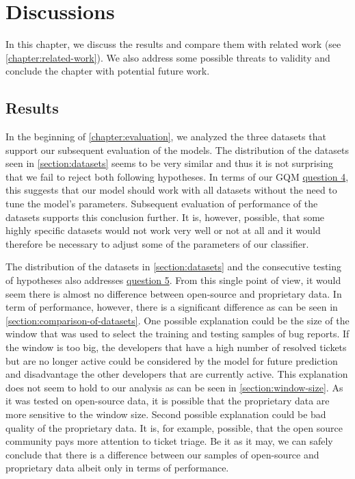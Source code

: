 \chapter{Discussions}

In this chapter, we discuss the results and compare them with related work (see \autoref{chapter:related-work}). We also address some possible threats to validity and conclude the chapter with potential future work.

\section{Results}

In the beginning of \autoref{chapter:evaluation}, we analyzed the three datasets that support our subsequent evaluation of the models. The distribution of the datasets seen in \autoref{section:datasets} seems to be very similar and thus it is not surprising that we fail to reject both following hypotheses. In terms of our GQM \hyperlink{question:4}{question 4}, this suggests that our model should work with all datasets without the need to tune the model's parameters. Subsequent evaluation of performance of the datasets supports this conclusion further. It is, however, possible, that some highly specific datasets would not work very well or not at all and it would therefore be necessary to adjust some of the parameters of our classifier.

The distribution of the datasets in \autoref{section:datasets} and the consecutive testing of hypotheses also addresses \hyperlink{question:5}{question 5}. From this single point of view, it would seem there is almost no difference between open-source and proprietary data. In term of performance, however, there is a significant difference as can be seen in \autoref{section:comparison-of-datasets}. One possible explanation could be the size of the window that was used to select the training and testing samples of bug reports. If the window is too big, the developers that have a high number of resolved tickets but are no longer active could be considered by the model for future prediction and disadvantage the other developers that are currently active. This explanation does not seem to hold to our analysis as can be seen in \autoref{section:window-size}. As it was tested on open-source data, it is possible that the proprietary data are more sensitive to the window size. Second possible explanation could be bad quality of the proprietary data. It is, for example, possible, that the open source community pays more attention to ticket triage. Be it as it may, we can safely conclude that there is a difference between our samples of open-source and proprietary data albeit only in terms of performance.

